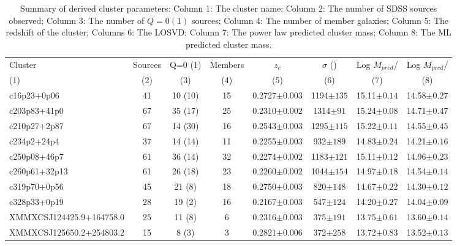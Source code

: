 \begin{landscape}
	\begin{table}
		\caption[Summary of derived cluster parameters.]{Summary of derived cluster parameters: Column 1: The cluster name; Column 2: The number of SDSS sources observed; Column 3: The number of $Q=0(1)$ sources; Column 4: The number of member galaxies; Column 5: The redshift of the cluster; Columns 6: The LOSVD; Column 7: The power law predicted cluster mass; Column 8: The ML predicted cluster mass.} 
		\begin{tabular}
			{lccccccc} \hline Cluster & Sources & Q=0 (1) & Members & $z_{c}$ & $\sigma$ (\kms) & Log $M_{pred}$/\Msol & Log $M_{pred}$/\Msol \\
			(1) & (2) & (3) & (4) & (5) & (6) & (7) & (8) \\
			\hline \hline 
			c16p23+0p06 & 41 & 10 (10) & 15 & 0.2727$\pm{0.003}$ & 1194$\pm{135}$ & 15.11$\pm{0.14}$ & 14.58$\pm{0.27}$ \\
			c203p83+41p0 & 67 & 35 (17) & 25 & 0.2310$\pm{0.002}$ & 1314$\pm{91}$ & 15.24$\pm{0.08}$ & 14.71$\pm{0.47}$ \\
			c210p27+2p87 & 67 & 14 (30) & 16 & 0.2543$\pm{0.003}$ & 1295$\pm{115}$ & 15.22$\pm{0.11}$ & 14.55$\pm{0.45}$ \\
			c234p2+24p4 & 37 & 14 (14) & 11 & 0.2255$\pm{0.003}$ & 932$\pm{189}$ & 14.83$\pm{0.24}$ & 14.21$\pm{0.16}$ \\
			c250p08+46p7 & 61 & 36 (14) & 32 & 0.2274$\pm{0.002}$ & 1183$\pm{121}$ & 15.11$\pm{0.12}$ & 14.96$\pm{0.23}$ \\
			c260p61+32p13 & 61 & 26 (18) & 23 & 0.2260$\pm{0.002}$ & 1044$\pm{154}$ & 14.97$\pm{0.18}$ & 14.54$\pm{0.14}$ \\
			c319p70+0p56 & 45 & 21 (8) & 18 & 0.2750$\pm{0.003}$ & 820$\pm{148}$ & 14.67$\pm{0.22}$ & 14.30$\pm{0.12}$ \\
			c328p33+0p19 & 28 & 19 (2) & 16 & 0.2167$\pm{0.003}$ & 547$\pm{124}$ & 14.20$\pm{0.27}$ & 14.04$\pm{0.09}$ \\
			XMMXCSJ124425.9+164758.0 & 25 & 11 (8) & 6 & 0.2316$\pm{0.003}$ & 375$\pm{191}$ & 13.75$\pm{0.61}$ & 13.60$\pm{0.14}$ \\
			XMMXCSJ125650.2+254803.2 & 15 & 8 (3) & 3 & 0.2821$\pm{0.006}$ & 372$\pm{258}$ & 13.72$\pm{0.83}$ & 13.52$\pm{0.13}$ \\
			\hline 
		\end{tabular}
		\label{2tbl: derived parameters} 
	\end{table}
\end{landscape}


